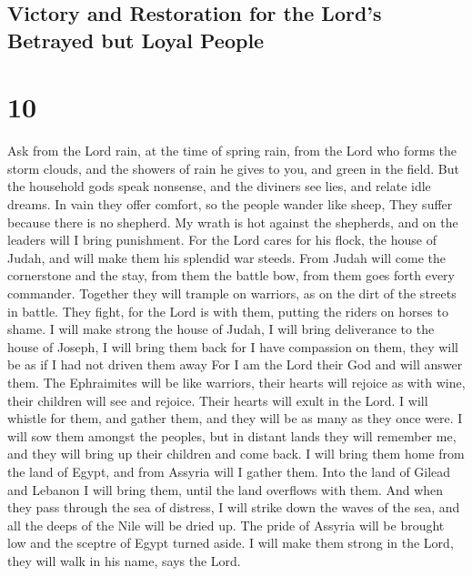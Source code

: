 \hypertarget{victory-and-restoration-for-the-lords-betrayed-but-loyal-people}{%
\subsection{Victory and Restoration for the Lord's Betrayed but Loyal
People}\label{victory-and-restoration-for-the-lords-betrayed-but-loyal-people}}

\hypertarget{section-9}{%
\section{10}\label{section-9}}

 Ask from the Lord rain, at the time of spring rain, from
the Lord who forms the storm clouds, and the showers of rain he gives to
you, and green in the field.  But the household gods speak
nonsense, and the diviners see lies, and relate idle dreams. In vain
they offer comfort, so the people wander like sheep, They suffer because
there is no shepherd.  My wrath is hot against the
shepherds, and on the leaders will I bring punishment. For the Lord
cares for his flock, the house of Judah, and will make them his splendid
war steeds.  From Judah will come the cornerstone and the
stay, from them the battle bow, from them goes forth every commander.
 Together they will trample on warriors, as on the dirt of
the streets in battle. They fight, for the Lord is with them, putting
the riders on horses to shame.  I will make strong the house
of Judah, I will bring deliverance to the house of Joseph, I will bring
them back for I have compassion on them, they will be as if I had not
driven them away For I am the Lord their God and will answer them.
 The Ephraimites will be like warriors, their hearts will
rejoice as with wine, their children will see and rejoice. Their hearts
will exult in the Lord.  I will whistle for them, and gather
them, and they will be as many as they once were.  I will
sow them amongst the peoples, but in distant lands they will remember
me, and they will bring up their children and come back.  I
will bring them home from the land of Egypt, and from Assyria will I
gather them. Into the land of Gilead and Lebanon I will bring them,
until the land overflows with them.  And when they pass
through the sea of distress, I will strike down the waves of the sea,
and all the deeps of the Nile will be dried up. The pride of Assyria
will be brought low and the sceptre of Egypt turned aside. 
I will make them strong in the Lord, they will walk in his name, says
the Lord.

